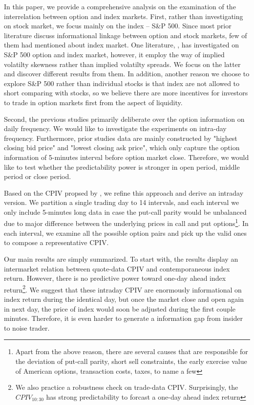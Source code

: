 In this paper, we provide a comprehensive analysis on the examination of the interrelation between option and index markets. First, rather than investigating on stock market, we focus mainly on the index -- S\&P 500. Since most prior literature discuss informational linkage between option and stock markets, few of them had mentioned about index market. One literature, \textcite{atilgan2015implied},  has investigated on S\&P 500 option and index market, however, it employ the way of implied volatilty skewness rather than implied volatilty spreads. We focus on the latter and discover different results from them. In addition, another reason we choose to explore S\&P 500 rather than individual stocks is that index are not allowed to short comparing with stocks, so we believe there are more incentives for investors to trade in option markets first from the aspect of liquidity.

Second, the previous studies primarily deliberate over the option information on daily frequency. We would like to investigate the experiments on intra-day frequency. Furthermore, prior studies data are mainly constructed by "highest closing bid price" and "lowest closing ask price", which only capture the option information of 5-minutes interval before option market close. Therefore, we would like to test whether the predictability power is stronger in open period, middle period or close period.
         
Based on the CPIV propsed by \textcite{cremers2010deviations}, we refine this approach and derive an intraday version. We partition a single trading day to 14 intervals, and each interval we only include 5-minutes long data in case the put-call parity would be unbalanced due to major difference between the underlying prices in call and put options\footnote{Apart from the above reason, there are several causes that are responsible for the deviation of put-call parity, short sell constraints, the early exercise value of American options, transaction costs, taxes, to name a few}. In each interval, we examine all the possible option pairs and pick up the valid ones to compose a representative CPIV.

Our main results are simply summarized. To start with, the results display an intermarket relation between quote-data CPIV and contemporaneous index return. However, there is no predictive power toward one-day ahead index return\footnote{We also practice a robustness check on trade-data CPIV. Surprisingly, the $CPIV_{10:30}$ has strong predictability to forcast a one-day ahead index return}. We suggest that these intraday CPIV are enormously informational on index return during the identical day, but once the market close and open again in next day, the price of index would soon be adjusted during the first couple minutes. Therefore, it is even harder to generate a information gap from insider to noise trader.  


